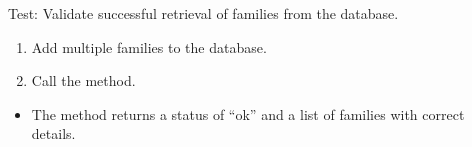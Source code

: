 \documentclass[letterpaper,10pt,english]{sphinxmanual}
\begin{document}
\begin{fulllineitems}
\label{\detokenize{test:test.test_family.test_list_families_success}}
\pysigstartsignatures
\pysiglinewithargsret
{}
{}
{}
\pysigstopsignatures
\sphinxAtStartPar
Test: Validate successful retrieval of families from the database.
\begin{description}
\begin{enumerate}
%
\item {} 
\sphinxAtStartPar
Add multiple families to the database.

\item {} 
\sphinxAtStartPar
Call the  method.

\end{enumerate}

\begin{itemize}
\item {} 
\sphinxAtStartPar
The method returns a status of “ok” and a list of families with correct details.

\end{itemize}

\end{description}

\end{fulllineitems}

\end{document}
